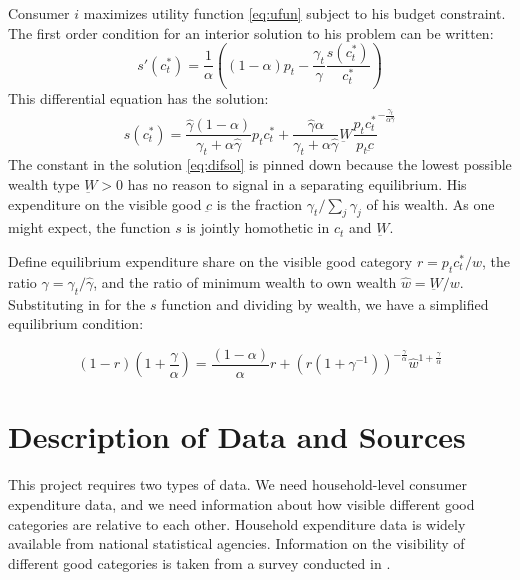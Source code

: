 Consumer $i$ maximizes utility function \eqref{eq:ufun} subject to his budget constraint.  The first order condition for an interior solution to his problem can be written:
\begin{equation}
	\label{foc}
s'(c_t^*) = \frac{1}{\alpha}\left( \left( 1-\alpha\right) p_t - \frac{\gamma_t}{\hat{\gamma}}\frac{s(c_t^*)}{c_t^*}\right)
\end{equation}
This differential equation has the solution:
\begin{equation}
	\label{eq:difsol}
    s(c_t^*) = \frac{\hat{\gamma}\left(1-\alpha\right)}{\gamma_t +\alpha \hat{\gamma}} p_t c_t^* +  \frac{\hat{\gamma} \alpha }{\gamma_t + \alpha \hat{\gamma}} \underbar{W}\frac{p_t c_t^*}{p_t \underbar{c}}^{-\frac{\gamma_t}{\alpha \hat{\gamma}}}
\end{equation}
The constant in the solution \eqref{eq:difsol} is pinned down because the lowest possible wealth type $\underbar{W} > 0$ has no reason to signal in a separating equilibrium.  His expenditure on the visible good $\underbar{c}$ is the fraction $\gamma_t / \sum_j \gamma_j$ of his wealth.  As one might expect, the function $s$ is jointly homothetic in $c_t$ and $\underbar{W}$.

Define equilibrium expenditure share on the visible good category $r = p_t c_t^* / w$, the ratio $\gamma = \gamma_t / \hat{\gamma}$, and the ratio of minimum wealth to own wealth $\hat{w} = \underbar{W} / w$.  Substituting in for the $s$ function and dividing by wealth, we have a simplified equilibrium condition:

\begin{equation}
	\label{eq:eq_cond}
    (1 - r)(1 + \frac{\gamma}{\alpha}) = \frac{\left(1-\alpha\right)}{\alpha} r +  \left(r\left(1 + \gamma^{-1}\right)\right)^{-\frac{\gamma}{\alpha}}\hat{w}^{1+\frac{\gamma}{\alpha}}
\end{equation}

\section{Description of Data and Sources}
This project requires two types of data.  We need household-level consumer expenditure data, and we need information about how visible different good categories are relative to each other.  Household expenditure data is widely available from national statistical agencies.  Information on the visibility of different good categories is taken from a survey conducted in \citet{Heffetz2011}.

